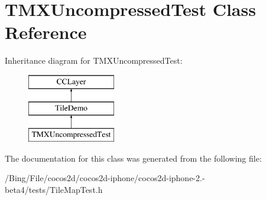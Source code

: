 \hypertarget{interface_t_m_x_uncompressed_test}{\section{T\-M\-X\-Uncompressed\-Test Class Reference}
\label{interface_t_m_x_uncompressed_test}
}
Inheritance diagram for T\-M\-X\-Uncompressed\-Test\-:\begin{figure}[H]
\begin{center}
\leavevmode
\includegraphics[height=3.000000cm]{interface_t_m_x_uncompressed_test}
\end{center}
\end{figure}


The documentation for this class was generated from the following file\-:\begin{DoxyCompactItemize}
\item 
/\-Bing/\-File/cocos2d/cocos2d-\/iphone/cocos2d-\/iphone-\/2.-\/beta4/tests/Tile\-Map\-Test.\-h\end{DoxyCompactItemize}
